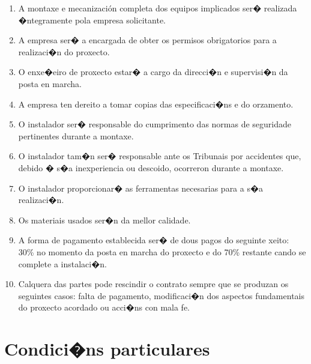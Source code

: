 \documentclass[11pt,twoside]{book}
\begin{document}
\begin{enumerate}
\item A montaxe e mecanización completa dos equipos implicados ser� realizada �ntegramente pola empresa solicitante.
\item A empresa ser� a encargada de obter os permisos obrigatorios para a realizaci�n do proxecto.
\item O enxe�eiro de proxecto estar� a cargo da direcci�n e supervisi�n da posta en marcha.
\item A empresa ten dereito a tomar copias das especificaci�ns e do orzamento.
\item O instalador ser� responsable do cumprimento das normas de seguridade pertinentes durante a montaxe.
\item O instalador tam�n ser� responsable ante os Tribunais por accidentes que, debido � s�a inexperiencia ou descoido, ocorreron durante a montaxe.
\item O instalador proporcionar� as ferramentas necesarias para a s�a realizaci�n.
\item Os materiais usados ser�n da mellor calidade.
\item A forma de pagamento establecida ser� de dous pagos do seguinte xeito: 30\% no momento da posta en marcha do proxecto e do 70\% restante cando se complete a instalaci�n.
\item Calquera das partes pode rescindir o contrato sempre que se produzan os seguintes casos: falta de pagamento, modificaci�n dos aspectos fundamentais do proxecto acordado ou acci�ns con mala fe.
\end{enumerate}

\chapter{Condici�ns particulares}
\end{document}
